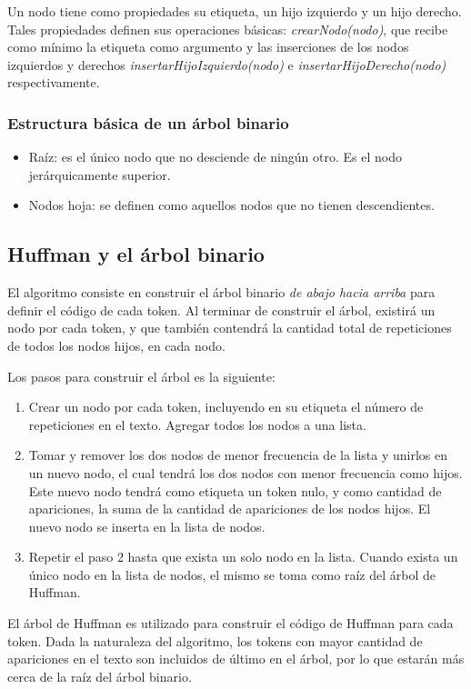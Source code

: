 \documentclass{IEEEtran}
\begin{document}
Un nodo tiene como propiedades su etiqueta, un hijo izquierdo y un hijo derecho. Tales propiedades definen sus operaciones b\'asicas: \emph{crearNodo(nodo)}, que recibe como m\'inimo la etiqueta como argumento y las inserciones de los nodos izquierdos y derechos \emph{insertarHijoIzquierdo(nodo)} e \emph{insertarHijoDerecho(nodo)} respectivamente.

\subsubsection{Estructura b\'asica de un \'arbol binario}
\begin{itemize}
  \item Ra\'iz: es el \'unico nodo que no desciende de ning\'un otro. Es el nodo jer\'arquicamente superior.
  \item Nodos hoja: se definen como aquellos nodos que no tienen descendientes.
\end{itemize}

\subsection{Huffman y el \'arbol binario}
El algoritmo consiste en construir el \'arbol binario \emph{de abajo hacia arriba} para definir el c\'odigo de cada token. Al terminar de construir el \'arbol, existir\'a un nodo por cada token, y que tambi\'en contendr\'a la cantidad total de repeticiones de todos los nodos hijos, en cada nodo.

Los pasos para construir el \'arbol es la siguiente:
\begin{enumerate}
  \item Crear un nodo por cada token, incluyendo en su etiqueta el n\'umero de repeticiones en el texto. Agregar todos los nodos a una lista.
  \item Tomar y remover los dos nodos de menor frecuencia de la lista y unirlos en un nuevo nodo, el cual tendr\'a los dos nodos con menor frecuencia como hijos. Este nuevo nodo tendr\'a como etiqueta un token nulo, y como cantidad de apariciones, la suma de la cantidad de apariciones de los nodos hijos. El nuevo nodo se inserta en la lista de nodos.
  \item Repetir el paso 2 hasta que exista un solo nodo en la lista. Cuando exista un \'unico nodo en la lista de nodos, el mismo se toma como ra\'iz del \'arbol de Huffman.
\end{enumerate}

El \'arbol de Huffman es utilizado para construir el c\'odigo de Huffman para cada token. Dada la naturaleza del algoritmo, los tokens con mayor cantidad de apariciones en el texto son incluidos de \'ultimo en el \'arbol, por lo que estar\'an m\'as cerca de la ra\'iz del \'arbol binario.
\end{document}
